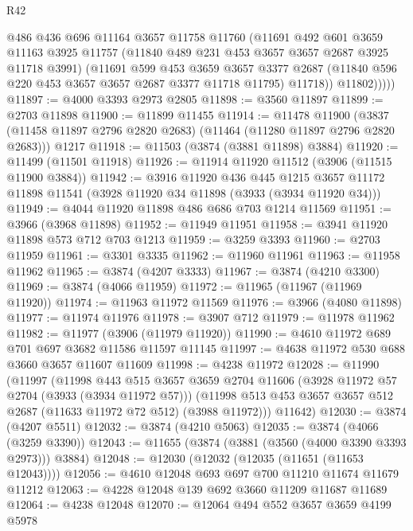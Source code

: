 \begin{lexlean}{R42}
\begin{coremodule}
              @486
              @436
              @696
              @11164
              @3657
              @11758
              @11760
              (@11691
                @492
                @601
                @3659
                @11163
                @3925
                @11757
                (@11840 @489 @231 @453 @3657 @3657 @2687 @3925 @11718 @3991)
                (@11691
                  @599
                  @453
                  @3659
                  @3657
                  @3377
                  @2687
                  (@11840 @596 @220 @453 @3657 @3657 @2687 @3377 @11718 @11795)
                  @11718))
              @11802)))))
@11897 := @4000 @3393 @2973 @2805
@11898 := @3560 @11897
@11899 := @2703 @11898
@11900 := @11899 @11455
@11914 := @11478
    @11900
    (@3837 (@11458 @11897 @2796 @2820 @2683) (@11464 (@11280 @11897 @2796 @2820 @2683)))
    @1217
@11918 := @11503 (@3874 (@3881 @11898) @3884)
@11920 := @11499 (@11501 @11918)
@11926 := @11914 @11920 @11512 (@3906 (@11515 @11900 @3884))
@11942 := @3916
    @11920
    @436
    @445
    @1215
    @3657
    @11172
    @11898
    @11541
    (@3928 @11920 @34 @11898 (@3933 (@3934 @11920 @34)))
@11949 := @4044 @11920 @11898 @486 @686 @703 @1214 @11569
@11951 := @3966 (@3968 @11898)
@11952 := @11949 @11951
@11958 := @3941 @11920 @11898 @573 @712 @703 @1213
@11959 := @3259 @3393
@11960 := @2703 @11959
@11961 := @3301 @3335
@11962 := @11960 @11961
@11963 := @11958 @11962
@11965 := @3874 (@4207 @3333)
@11967 := @3874 (@4210 @3300)
@11969 := @3874 (@4066 @11959)
@11972 := @11965 (@11967 (@11969 @11920))
@11974 := @11963 @11972 @11569
@11976 := @3966 (@4080 @11898)
@11977 := @11974 @11976
@11978 := @3907 @712
@11979 := @11978 @11962
@11982 := @11977 (@3906 (@11979 @11920))
@11990 := @4610 @11972 @689 @701 @697 @3682 @11586 @11597 @11145
@11997 := @4638 @11972 @530 @688 @3660 @3657 @11607 @11609
@11998 := @4238 @11972
@12028 := @11990
    (@11997
      (@11998
        @443
        @515
        @3657
        @3659
        @2704
        @11606
        (@3928 @11972 @57 @2704 (@3933 (@3934 @11972 @57)))
        (@11998 @513 @453 @3657 @3657 @512 @2687 (@11633 @11972 @72 @512) (@3988 @11972)))
      @11642)
@12030 := @3874 (@4207 @5511)
@12032 := @3874 (@4210 @5063)
@12035 := @3874 (@4066 (@3259 @3390))
@12043 := @11655 (@3874 (@3881 (@3560 (@4000 @3390 @3393 @2973))) @3884)
@12048 := @12030 (@12032 (@12035 (@11651 (@11653 @12043))))
@12056 := @4610 @12048 @693 @697 @700 @11210 @11674 @11679 @11212
@12063 := @4228 @12048 @139 @692 @3660 @11209 @11687 @11689
@12064 := @4238 @12048
@12070 := @12064 @494 @552 @3657 @3659 @4199 @5978

\end{coremodule}
\end{lexlean}
